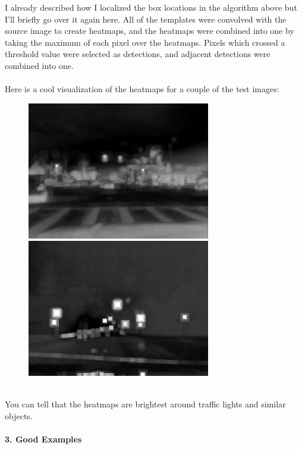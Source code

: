 \documentclass[12pt,letterpaper]{article} \usepackage{fullpage}
\begin{document}
I already described how I localized the box locations in the algorithm above but I'll
briefly go over it again here. All of the templates were convolved with the source
image to create heatmaps, and the heatmaps were combined into one by taking the maximum
of each pixel over the heatmaps. Pixels which crossed a threshold value were selected
as detections, and adjacent detections were combined into one.\\\\
Here is a cool visualization of the heatmaps for a couple of the test images:
\begin{figure}[htp]
    \centering
    \includegraphics[width=8cm]{img/heatmap-196.jpg}
    \includegraphics[width=8cm]{img/heatmap-334.jpg}
\end{figure}\\
You can tell that the heatmaps are brightest around traffic lights and similar
objects.
\\\\
\textbf{3. Good Examples}
\end{document}
